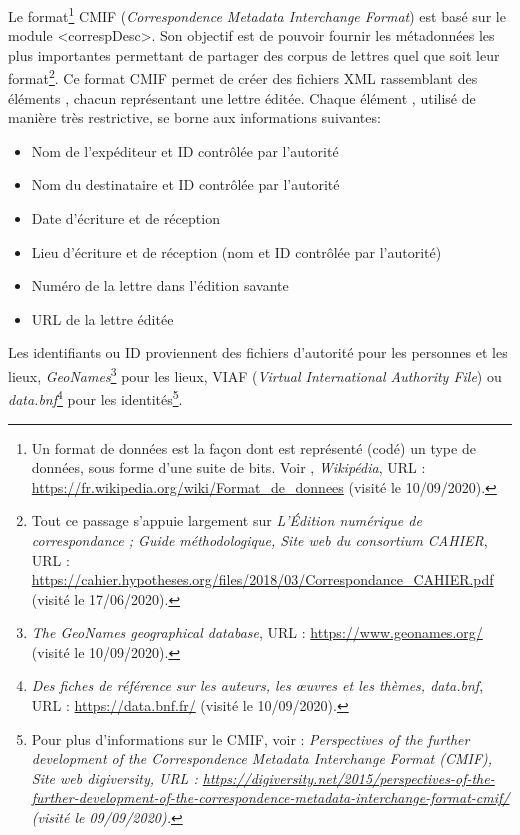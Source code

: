 Le format\footnote{Un format de données est la façon dont est représenté (codé) un type de données, sous forme d'une suite de bits. Voir , \emph{Wikipédia}, URL : \url{https://fr.wikipedia.org/wiki/Format_de_donnees} (visité le 10/09/2020).} CMIF (\emph{Correspondence Metadata Interchange Format}) est basé sur le module <correspDesc>. Son objectif est de pouvoir fournir les métadonnées les plus importantes permettant de partager des corpus de lettres quel que soit leur format\footnote{Tout ce passage s'appuie largement sur \emph{L’Édition numérique de correspondance ; Guide méthodologique, Site web du consortium CAHIER}, URL : \url{https://cahier.hypotheses.org/files/2018/03/Correspondance_CAHIER.pdf} (visité le 17/06/2020).}. 
Ce format CMIF permet de créer des fichiers XML rassemblant des éléments , chacun représentant une lettre éditée. Chaque élément , utilisé de manière très restrictive, se borne aux informations suivantes:
\begin{itemize}
    \item Nom de l’expéditeur et ID contrôlée par l’autorité
    \item Nom du destinataire et ID contrôlée par l’autorité
    \item Date d’écriture et de réception
    \item Lieu d’écriture et de réception (nom et ID contrôlée par l’autorité)
    \item Numéro de la lettre dans l’édition savante
    \item URL de la lettre éditée
\end{itemize}
Les identifiants ou ID proviennent des fichiers d’autorité pour les personnes et les lieux, \emph{GeoNames}\footnote{\emph{The GeoNames geographical database}, URL : \url{https://www.geonames.org/} (visité le 10/09/2020).} pour les lieux, VIAF (\emph{Virtual International Authority File}) ou \emph{data.bnf}\footnote{\emph{Des fiches de référence sur les auteurs, les œuvres et les thèmes, data.bnf}, URL : \url{https://data.bnf.fr/} (visité le 10/09/2020).} pour les identités\footnote{Pour plus d'informations sur le CMIF, voir : \emph{
Perspectives of the further development of the Correspondence Metadata Interchange Format (CMIF), Site web digiversity, URL : \url{https://digiversity.net/2015/perspectives-of-the-further-development-of-the-correspondence-metadata-interchange-format-cmif/} (visité le 09/09/2020).}}.\\

